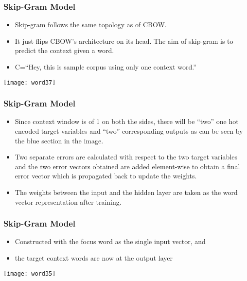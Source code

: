 \begin{frame}[fragile]\frametitle{Skip-Gram Model}
\begin{itemize}
\item Skip-gram follows the same topology as of CBOW. 
\item It just flips CBOW's architecture on its head. The aim of skip-gram is to predict the context given a word. 
\item C=``Hey, this is sample corpus using only one context word.''
\end{itemize}
\begin{center}
\texttt{[image: word37]}
\end{center}
\end{frame}

\begin{frame}[fragile]\frametitle{Skip-Gram Model}
\begin{itemize}
\item Since context window is of 1 on both the sides, there will be ``two'' one hot encoded target variables and ``two'' corresponding outputs as can be seen by the blue section in the image.
\item Two separate errors are calculated with respect to the two target variables and the two error vectors obtained are added element-wise to obtain a final error vector which is propagated back to update the weights.
\item The weights between the input and the hidden layer are taken as the word vector representation after training.
\end{itemize}
\end{frame}

\begin{frame}[fragile]\frametitle{Skip-Gram Model}
\begin{itemize}
\item Constructed with the focus word as the single input vector, and 
\item the target context words are now at the output layer
\end{itemize}
\begin{center}
\texttt{[image: word35]}
\end{center}

\end{frame}


